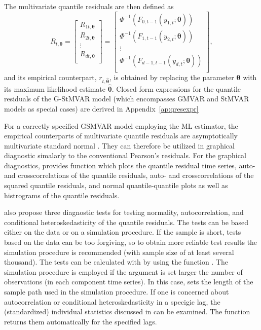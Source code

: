 \documentclass[nojss]{jss}
\begin{document}
The multivariate quantile residuals are then defined as
\begin{equation}\label{eq:qrdef}
R_{t,\boldsymbol{\theta}}=
\begin{bmatrix}
  R_{1t,\boldsymbol{\theta}} \\
  R_{2t,\boldsymbol{\theta}} \\
  \vdots \\
  R_{dt,\boldsymbol{\theta}} \\
\end{bmatrix} =
\begin{bmatrix}
  \Phi^{-1}(F_{0,t-1}(y_{1,t};\boldsymbol{\theta})) \\
  \Phi^{-1}(F_{1,t-1}(y_{2,t};\boldsymbol{\theta}))\\
  \vdots \\
  \Phi^{-1}(F_{d-1,t-1}(y_{d,t};\boldsymbol{\theta})) \\
\end{bmatrix},
\end{equation}
and its empirical counterpart, $r_{t,\hat{\boldsymbol{\theta}}}$,  is obtained by replacing the parameter $\boldsymbol{\theta}$ with its maximum likelihood estimate $\hat{\boldsymbol{\theta}}$. Closed form expressions for the quantile residuals of the G-StMVAR model (which encompasses GMVAR and StMVAR models as special cases) are derived in Appendix~\ref{ap:qresexpr}

For a correctly specified GSMVAR model employing the ML estimator, the empirical counterparts of multivariate quantile residuals are asymptotically multivariate standard normal \citep[Lemma 3]{Kalliovirta+Saikkonen:2010}. They can therefore be utilized in graphical diagnostic simalarly to the conventional Pearson's residuals. For the graphical diagnostics,  provides function  which plots the quantile residual time series, auto- and crosscorrelations of the quantile residuals, auto- and crosscorrelations of the squared quantile residuals, and normal quantile-quantile plots as well as histrograms of the quantile residuals.

\cite{Kalliovirta+Saikkonen:2010} also propose three diagnostic tests for testing normality, autocorrelation, and conditional heteroskedasticity of the quantile residuals. The tests can be based either on the data or on a simulation procedure. If the sample is short, tests based on the data can be too forgiving, so to obtain more reliable test results the simulation procedure is recommended (with sample size of at least several thousand). The tests can be calculated with  by using the function . The simulation procedure is employed if the argument  is set larger the number of observations (in each component time series). In this case,  sets the length of the sample path used in the simulation procedure. If one is concerned about autocorrelation or conditional heteroskedasticity in a specigic lag, the (standardized) individual statistics discussed in \cite{Kalliovirta+Saikkonen:2010} can be examined. The function  returns them automatically for the specified lags.
\end{document}
